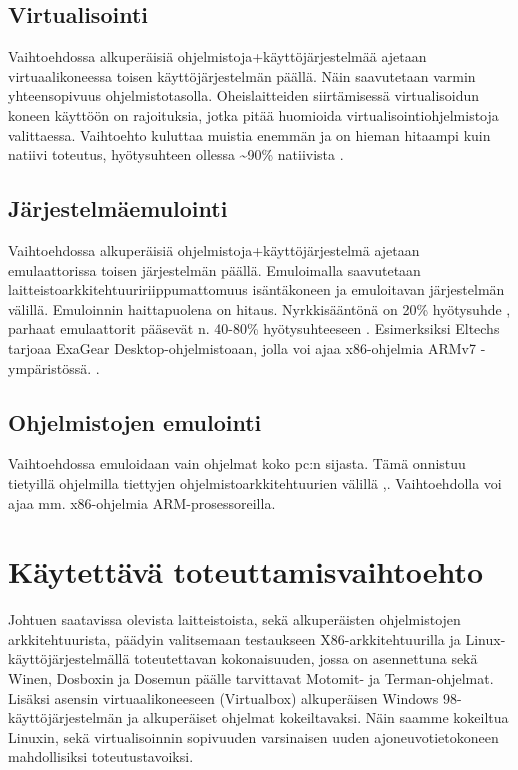 \documentclass[11pt,a4paper,oneside,article]{memoir}
\begin{document}
\subsection{Virtualisointi}

Vaihtoehdossa alkuperäisiä ohjelmistoja+käyttöjärjestelmää ajetaan virtuaalikoneessa toisen käyttöjärjestelmän päällä. Näin saavutetaan varmin yhteensopivuus ohjelmistotasolla. Oheislaitteiden siirtämisessä virtualisoidun koneen käyttöön on rajoituksia, jotka pitää huomioida virtualisointiohjelmistoja valittaessa. Vaihtoehto kuluttaa muistia enemmän ja on hieman hitaampi kuin natiivi toteutus, hyötysuhteen ollessa \textasciitilde{}90\%  natiivista \cite{virtnat_anadtech}.

\subsection{Järjestelmäemulointi}

Vaihtoehdossa alkuperäisiä ohjelmistoja+käyttöjärjestelmä ajetaan emulaattorissa toisen järjestelmän päällä. Emuloimalla saavutetaan laitteistoarkkitehtuuririippumattomuus isäntäkoneen ja emuloitavan järjestelmän välillä. Emuloinnin haittapuolena on hitaus. Nyrkkisääntönä on 20\% hyötysuhde \cite{tinycc}, parhaat emulaattorit pääsevät n. 40-80\% hyötysuhteeseen \cite{40pperf}. Esimerksiksi Eltechs tarjoaa ExaGear Desktop-ohjelmistoaan, jolla voi ajaa x86-ohjelmia ARMv7 -ympäristössä. \cite{eltechs:exagear}. 

\subsection{Ohjelmistojen emulointi}

Vaihtoehdossa emuloidaan vain ohjelmat koko pc:n sijasta. Tämä onnistuu tietyillä ohjelmilla tiettyjen ohjelmistoarkkitehtuurien välillä \cite{tinycc},\cite{qemu_use}. Vaihtoehdolla voi ajaa mm. x86-ohjelmia ARM-prosessoreilla.

\section{Käytettävä toteuttamisvaihtoehto}

Johtuen saatavissa olevista laitteistoista, sekä alkuperäisten ohjelmistojen arkkitehtuurista, päädyin valitsemaan testaukseen X86-arkkitehtuurilla ja Linux-käyttöjärjestelmällä toteutettavan kokonaisuuden, jossa on asennettuna sekä Winen, Dosboxin ja Dosemun päälle tarvittavat Motomit- ja Terman-ohjelmat. Lisäksi asensin virtuaalikoneeseen (Virtualbox) alkuperäisen Windows 98-käyttöjärjestelmän ja alkuperäiset ohjelmat kokeiltavaksi. Näin saamme kokeiltua Linuxin, sekä virtualisoinnin sopivuuden varsinaisen uuden ajoneuvotietokoneen mahdollisiksi toteutustavoiksi.
\end{document}
